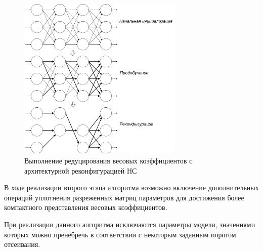 \begin{figure}[!h]
	\centering
	\includegraphics[width=0.7\textwidth]{man-source/images/ch2/pic2-3-1.png}
	\caption{Выполнение редуцирования весовых коэффициентов с архитектурной реконфигурацией НС}
	\label{fig:pic2_3}
  \end{figure}

В ходе реализации второго этапа алгоритма возможно включение дополнительных операций уплотнения разреженных матриц параметров для достижения более компактного представления весовых коэффициентов.

При реализации данного алгоритма исключаются параметры модели, значениями которых можно пренебречь в соответствии с некоторым заданным порогом отсеивания.


	
